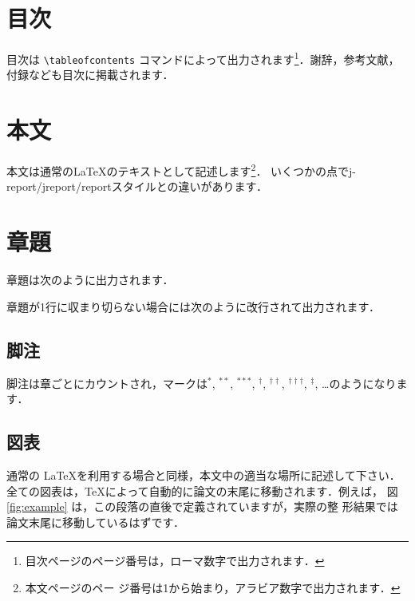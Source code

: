 \documentclass[
  sotsuron]{kuee}
\begin{document}
\hypertarget{ux76eeux6b21}{%
\section{目次}\label{ux76eeux6b21}}

目次は \verb+\tableofcontents+ コマンドによって出力されます\footnote
{目次ページのページ番号は，ローマ数字で出力されます．}．謝辞，参考文献，
付録なども目次に掲載されます．

\hypertarget{ux672cux6587}{%
\section{本文}\label{ux672cux6587}}

本文は通常の\LaTeX のテキストとして記述します\footnote{本文ページのペー
  ジ番号は1から始まり，アラビア数字で出力されます．}．
いくつかの点でj-report/jreport/reportスタイルとの違いがあります．

\hypertarget{ux7ae0ux984c}{%
\section{章題}\label{ux7ae0ux984c}}

章題は次のように出力されます．

章題が1行に収まり切らない場合には次のように改行されて出力されます．

\hypertarget{ux811aux6ce8}{%
\subsection{脚注}\label{ux811aux6ce8}}

脚注は章ごとにカウントされ，マークは\(^{*}\), \(^{**}\), \(^{***}\),
\(^{\dagger}\), \(^{\dagger\dagger}\), \(^{\dagger\dagger\dagger}\),
\(^{\ddagger}\), \ldots のようになります．

\hypertarget{ux56f3ux8868}{%
\subsection{図表}\label{ux56f3ux8868}}

通常の \LaTeX を利用する場合と同様，本文中の適当な場所に記述して下さい．
全ての図表は，\TeX によって自動的に論文の末尾に移動されます．例えば， 図
\ref{fig:example} は，この段落の直後で定義されていますが，実際の整
形結果では論文末尾に移動しているはずです．
\end{document}
